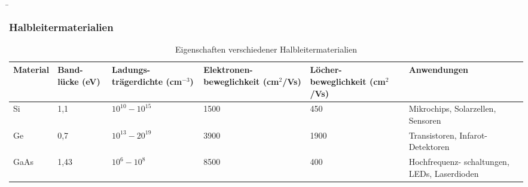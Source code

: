 \begin{frame}
    \b{
        \frametitle{Halbleitermaterialien}
        \begin{table}[H]
            \centering 
            \begin{tabular}{|p{1.7cm}|p{1.2cm}|p{2cm}|p{2.2cm}|p{2.2cm}|p{2.3cm}|}
                \hline
                \textbf{Material} & \textbf{Band- \newline lücke \newline (eV)} & \textbf{Ladungs- \newline trägerdichte \newline (cm$^{-3}$)} & \textbf{Elektronen- \newline beweglichkeit \newline (cm$^2$/Vs)} & \textbf{Löcher- \newline beweglichkeit \newline (cm$^2$/Vs)} & \textbf{Anwendungen}\\
                \hline
                Si  & 1,1 & $10^{10} - 10^{15}$ & 1500 & 450 & Mikrochips, \newline Solarzellen, Sensoren \\
                \hline
                Ge & 0,7 & $10^{13} - 20^{19}$ & 3900 & 1900 & Transistoren, \newline Infarot-Detektoren \\
                \hline
                GaAs & 1,43 & $10^6 - 10^8$ & 8500 & 400 & Hochfrequenz- schaltungen, LEDs, Laserdioden \\
                \hline
                \end{tabular}
                \caption{Eigenschaften verschiedener Halbleitermaterialien}
        \end{table}
    }

\end{frame}

